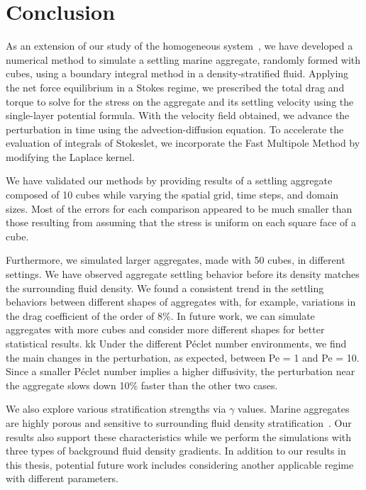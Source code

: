 \section{Conclusion}
As an extension of our study of the homogeneous system~\cite{yoo_hydrodynamic_2020}, we have developed a numerical method to simulate a settling marine aggregate, randomly formed with cubes, using a boundary integral method in a density-stratified fluid.
Applying the net force equilibrium in a Stokes regime, we prescribed the total drag and torque to solve for the stress on the aggregate and its settling velocity using the single-layer potential formula.
With the velocity field obtained, we advance the perturbation in time using the advection-diffusion equation. 
To accelerate the evaluation of integrals of Stokeslet, we incorporate the Fast Multipole Method by modifying the Laplace kernel.
\par
We have validated our methods by providing results of a settling aggregate composed of 10 cubes while varying the spatial grid, time steps, and domain sizes. 
Most of the errors for each comparison appeared to be much smaller than those resulting from assuming that the stress is uniform on each square face of a cube.
\par
Furthermore, we simulated larger aggregates, made with 50 cubes, in different settings. We have observed aggregate settling behavior before its density matches the surrounding fluid density.
We found a consistent trend in the settling behaviors between different shapes of aggregates with, for example, variations in the drag coefficient of the order of 8\%.   
In future work, we can simulate aggregates with more cubes and consider more different shapes for better statistical results. kk
Under the different Péclet number environments, we find the main changes in the perturbation, as expected, between Pe = 1 and Pe = 10. Since a smaller Péclet number implies a higher diffusivity, the perturbation near the aggregate slows down 10\% faster than the other two cases. 
\par
We also explore various stratification strengths via $\gamma$ values. 
Marine aggregates are highly porous and sensitive to surrounding fluid density stratification~\cite{prairie_delayed_2013}. Our results also support these characteristics while we perform the simulations with three types of background fluid density gradients.
In addition to our results in this thesis, potential future work includes considering another applicable regime with different parameters.
\par
